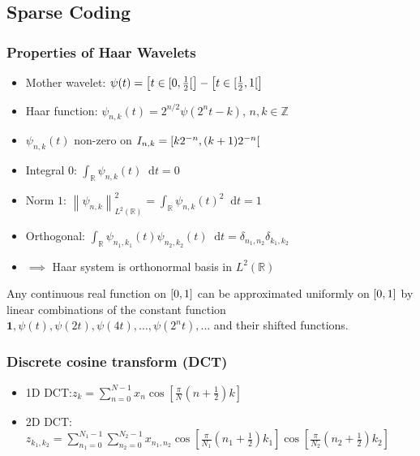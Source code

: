 \documentclass[11pt,a4paper,technote]{IEEEtran}
\newcommand{\iver}[1]{\left[#1\right]}
\newcommand{\norm}[1]{\left\lVert#1\right\rVert}
\newcommand{\vect}[1]{\boldsymbol{\mathbf{#1}}}
\newcommand*\diff{\mathop{}\!\mathrm{d}}
\newcommand{\R}{\mathbb{R}}
\newcommand{\Z}{\mathbb{Z}}
\begin{document}
\vspace{-1em}
\subsection*{Sparse Coding}
\subsubsection*{Properties of Haar Wavelets}
\begin{itemize}
  \item Mother wavelet: $\psi(t) = \iver{t\in\interval[open
      right]{0}{\frac{1}{2}}} - \iver{t\in\interval[open right]{\frac{1}{2}}{1}}$
    \item Haar function: $\psi_{n,k}(t) = 2^{n/2}\psi(2^{n}t-k)$, $n,k\in\Z$
    \item $\psi_{n,k}(t)$ non-zero on $I_{n,k} = \interval[open right]{k2^{-n}}
      {(k+1)2^{-n}}$
    \item Integral $0$: $\int_{\R}\psi_{n,k}(t)\diff t = 0$
    \item Norm $1$: $\norm{\psi_{n,k}}_{L^2(\R)}^2 = \int_{\R}
      {\psi_{n,k}(t)}^2\diff t = 1$
    \item Orthogonal: $\int_{\R}\psi_{n_1,k_1}(t) \psi_{n_2,k_2}(t)
      \diff t = \delta_{n_1,n_2}\delta_{k_1,k_2}$
    \item $\implies$ Haar system is orthonormal basis in $L^2(\R)$
\end{itemize}
Any continuous real function on $\interval{0}{1}$ can be approximated uniformly
on $\interval{0}{1}$ by linear combinations of the constant function $\vect{1},
\psi(t),\psi(2t),\psi(4t),\dotsc,\psi(2^n t),\dotsc$ and their shifted functions.

\subsubsection*{Discrete cosine transform (DCT)}
\begin{itemize}
  \item 1D DCT:\@ $z_k = \sum_{n=0}^{N-1}x_n\cos[\frac{\pi}{N}(n+\frac{1}{2})k]$
  \item 2D DCT:\@ $ z_{k_1,k_2} = \sum_{n_1=0}^{N_1-1} \sum_{n_2=0}^{N_2-1}
    x_{n_1,n_2} \cos [\frac{\pi}{N_1} (n_1+\frac{1}{2}) k_1 ] \cos
    [\frac{\pi}{N_2}(n_2+\frac{1}{2}) k_2]$
\end{itemize}
\end{document}
